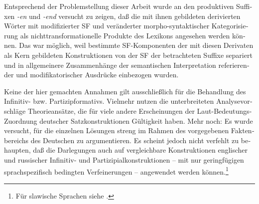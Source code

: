 \documentclass[output=paper,colorlinks,citecolor=brown, booklanguage=german]{langscibook}
\begin{document}
\begin{otherlanguage}{german}
Entsprechend der Problemstellung dieser Arbeit wurde an den produktiven Suffixen \textit{-en} und \textit{-end} versucht zu zeigen, daß die mit ihnen gebildeten de\-ri\-vier\-ten Wörter mit modifizierter SF und veränderter morpho-syntaktischer Ka\-te\-go\-ri\-sie\-rung als nichttransformationelle Produkte des Lexikons angesehen werden können. Das war möglich, weil bestimmte SF-Komponenten der mit diesen Derivaten als Kern gebildeten Konstruktionen von der SF der betrachteten Suffixe separiert und in allgemeinere Zusammenhänge der semantischen Interpretation referierender und modifikatorischer Ausdrücke einbezogen wurden.

Keine der hier gemachten Annahmen gilt ausschließlich für die Behandlung des Infinitiv- bzw. Partizipformativs. Vielmehr nutzen die unterbreiteten Ana\-ly\-se\-vor\-schlä\-ge Theorieansätze, die für viele andere Erscheinungen der Laut-Be\-deu\-tungs-Zuordnung deutscher Satzkonstruktionen Gültigkeit haben. Mehr noch: Es wurde versucht, für die einzelnen Lösungen streng im Rahmen des vorgegebenen Faktenbereichs des Deutschen zu argumentieren. Es scheint jedoch nicht verfehlt zu behaupten, daß die Darlegungen auch auf vergleichbare Konstruktionen englischer und russischer Infinitiv- und Partizipialkonstruktionen -- mit nur geringfügigen sprachspezifisch bedingten Verfeinerungen -- angewendet werden können.\footnote{Für slawische Sprachen siehe \citet{Ruzicka1978,Ruzicka1980,Ruzicka1982,Ruzicka1986,Ruzicka1987}.}



\printbibliography[heading=subbibliography,notkeyword=this]
\end{otherlanguage}
\end{document}
